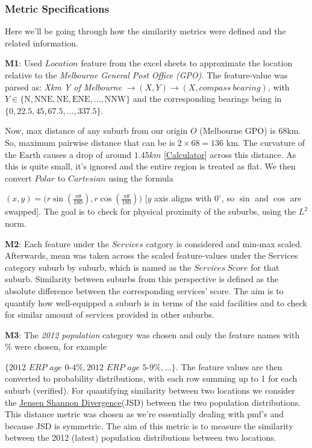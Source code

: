 \documentclass[
	a4paper, %
	10pt, %
	unnumberedsections, %
	twoside, %
]{LTJournalArticle}
\begin{document}
\subsubsection{Metric Specifications}\leavevmode


Here we'll be going through how the similarity metrics were defined and the related information.

\textbf{M1}: Used $Location$ feature from the excel sheets to approximate the location relative to the \textit{Melbourne General Post Office (GPO)}. The feature-value was parsed as: \newline
\textit{Xkm Y of Melbourne} $\rightarrow (X, Y) \rightarrow (X, compass\ bearing)$, with $Y \in \{\text{N}, \text{NNE}, \text{NE}, \text{ENE}, \dots,\text{NNW}\}$ and the corresponding bearings being in $\{0, 22.5, 45, 67.5,\dots, 337.5\}$.

Now, max distance of any suburb from our origin $O$ (Melbourne GPO) is 68km. So, maximum pairwise distance that can be is $2\times 68=136$ km. The curvature of the Earth causes a drop of around $1.45km$ [\href{https://earthcurvature.com/}{Calculator}] across this distance. As this is quite small, it's ignored and the entire region is treated as flat. We then convert $Polar$ to $Cartesian$ using the formula 

$(x, y) = \big(r\sin\left(\frac{\pi\theta}{180}\right), r\cos\left(\frac{\pi\theta}{180}\right)\big)$ [$y$ axis aligns with $0^\circ$, so $\sin$ and $\cos$ are swapped]. The goal is to check for physical proximity of the suburbs, using the $L^2$ norm.

\textbf{M2}: Each feature under the $Services$ catgory is considered and min-max scaled. Afterwards, mean was taken across the scaled feature-values under the Services category suburb by suburb, which is named as the $Services \ Score$ for that suburb. Similarity between suburbs from this perspective is defined as the absolute difference between the corresponding services' score. The aim is to quantify how well-equipped a suburb is in terms of the said facilities and to check for similar amount of services provided in other suburbs.

\textbf{M3}: The \textit{2012 population} category was chosen and only the feature names with $\%$ were chosen, for example

$\{ \textit{2012 ERP age 0-4\%}, \textit{2012 ERP age 5-9\%}, \dots\}$. The feature values are then converted to probability distributions, with each row summing up to 1 for each suburb (verified). For quantifying similarity between two locations we consider the \href{https://en.wikipedia.org/wiki/Jensen%E2%80%93Shannon_divergence}{Jensen Shannon Divergence}(JSD) between the two population distributions. This distance metric was chosen as we're essentially dealing with pmf's and because JSD is symmetric. The aim of this metric is to measure the similarity between the 2012 (latest) population distributions between two locations.
\end{document}
